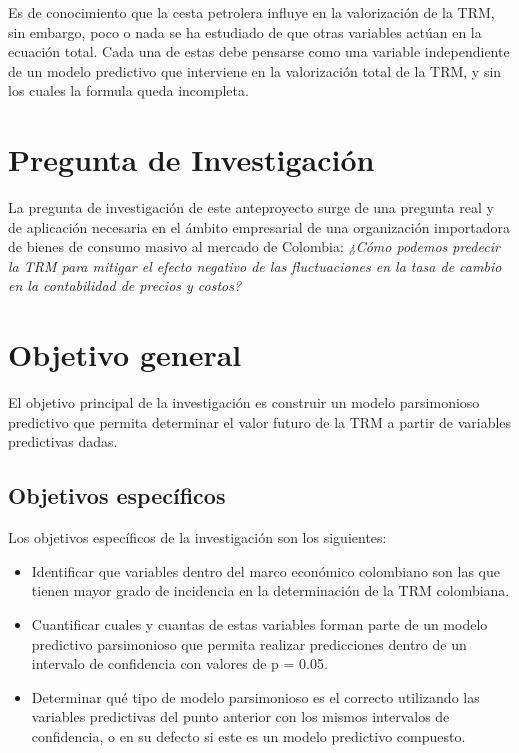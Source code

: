 Es de conocimiento que la cesta petrolera influye en la valorización de la TRM, sin embargo, poco o nada se ha estudiado de que otras variables actúan en la ecuación total. Cada una de estas debe pensarse como una variable independiente de un modelo predictivo que interviene en la valorización total de la TRM, y sin los cuales la formula queda incompleta.

\section{Pregunta de Investigación}
La pregunta de investigación de este anteproyecto surge de una pregunta real y de aplicación necesaria en el ámbito empresarial de una organización importadora de bienes de consumo masivo al mercado de Colombia: \emph{¿Cómo podemos predecir la TRM para mitigar el efecto negativo de las fluctuaciones en la tasa de cambio en la contabilidad de precios y costos?}

\section{Objetivo general}
El objetivo principal de la investigación es construir un modelo parsimonioso predictivo que permita determinar el valor futuro de la TRM a partir de variables predictivas dadas.

\subsection{Objetivos específicos}
Los objetivos específicos de la investigación son los siguientes:

\begin{itemize}
	\item Identificar que variables dentro del marco económico colombiano son las que tienen mayor grado de incidencia en la determinación de la TRM colombiana. 
	\item Cuantificar cuales y cuantas de estas variables forman parte de un modelo predictivo parsimonioso que permita realizar predicciones dentro de un intervalo de confidencia con valores de p = 0.05. 
	\item Determinar qué tipo de modelo parsimonioso es el correcto utilizando las variables predictivas del punto anterior con los mismos intervalos de confidencia, o en su defecto si este es un modelo predictivo compuesto. 
\end{itemize}

